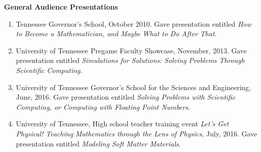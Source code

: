 \documentclass[11pt]{letter}
\begin{document}
	\smallskip

{\LARGE\bf General Audience Presentations}

    \begin{enumerate}
    \item
Tennessee Governor's School, October 2010. Gave presentation entitled {\sl How to Become a Mathematician, and Maybe What to Do After That}.
    
    \item
University of Tennessee Pregame Faculty Showcase, November, 2013. Gave presentation entitled {\sl Simulations for Solutions: Solving Problems Through Scientific Computing}.
    
    \item
University of Tennessee Governor's School for the Sciences and Engineering, June, 2016. Gave presentation entitled {\sl Solving Problems with Scientific Computing, or Computing with Floating Point Numbers}.

	\item
University of Tennessee, High school teacher training event {\sl Let's Get Physical! Teaching Mathematics through the Lens of Physics}, July, 2016. Gave presentation entitled {\sl  Modeling Soft Matter Materials}.

	\end{enumerate}
	
	\smallskip
	
\end{document}
